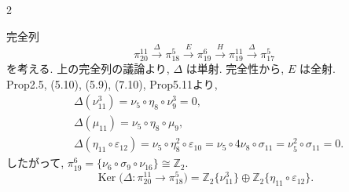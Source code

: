\documentclass[10pt, leqno]{ltjsarticle}
\newcommand{\gen}[1]{\{#1\}}       %
\newcommand{\Ker}{\operatorname{Ker}}
\numberwithin{equation}{section}
\theoremstyle{plain}
\theoremstyle{definition}
\theoremstyle{remark}
\begin{document}
\begin{paracol}{2}

\noindent
完全列
\[
\pi_{20}^{11}\xrightarrow{\ \Delta\ }\pi_{18}^{5}\xrightarrow{\ E\ }\pi_{19}^{6}
\xrightarrow{\ H\ }\pi_{19}^{11}\xrightarrow{\ \Delta\ }\pi_{17}^{5}
\]
を考える. 
上の完全列の議論より, \(\Delta\) は単射.
完全性から, \(E\) は全射. \\
Prop2.5, (5.10), (5.9), (7.10), Prop5.11より,
\begin{align*}
& \Delta(\nu_{11}^{3})=\nu_5\circ\eta_8\circ\nu_9^{3}=0,\\
& \Delta(\mu_{11})=\nu_5\circ\eta_8\circ\mu_9,\\
& \Delta(\eta_{11}\circ\varepsilon_{12})=\nu_5\circ\eta_8^{2}\circ\varepsilon_{10}
=\nu_5\circ 4\nu_8\circ\sigma_{11}
=\nu_5^{2}\circ\sigma_{11}=0.
\end{align*}
したがって,
\(
\pi_{19}^{6}=\gen{\nu_6\circ\sigma_9\circ\nu_{16}}\cong\mathbb{Z}_2.
\)
\begin{equation}
\Ker\bigl(\Delta:\pi_{20}^{11}\to\pi_{18}^{5}\bigr)
=\mathbb{Z}_2 \gen{\nu_{11}^{3}} 
\oplus \mathbb{Z}_2\gen{\eta_{11}\circ\varepsilon_{12}} . 
\end{equation}


\end{paracol}
\end{document}
